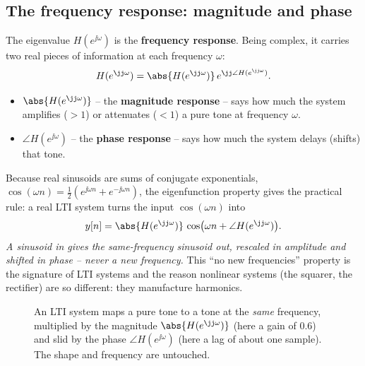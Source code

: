 \subsection*{The frequency response: magnitude and phase}

The eigenvalue $H(e^{\jj\omega})$ is the \textbf{frequency response}. Being
complex, it carries two real pieces of information at each frequency $\omega$:
\[
  H(e^{\jj\omega}) = \abs{H(e^{\jj\omega})}\,e^{\jj\angle H(e^{\jj\omega})}.
\]
\begin{itemize}
  \item $\abs{H(e^{\jj\omega})}$ -- the \textbf{magnitude response} -- says how
        much the system amplifies ($>1$) or attenuates ($<1$) a pure tone at
        frequency $\omega$.
  \item $\angle H(e^{\jj\omega})$ -- the \textbf{phase response} -- says how much
        the system delays (shifts) that tone.
\end{itemize}
Because real sinusoids are sums of conjugate exponentials,
$\cos(\omega n)=\tfrac12(e^{\jj\omega n}+e^{-\jj\omega n})$, the eigenfunction
property gives the practical rule: a real LTI system turns the input
$\cos(\omega n)$ into
\[
  y[n] = \abs{H(e^{\jj\omega})}\,\cos\!\big(\omega n + \angle H(e^{\jj\omega})\big).
\]
\emph{A sinusoid in gives the same-frequency sinusoid out, rescaled in amplitude
and shifted in phase -- never a new frequency.} This ``no new frequencies''
property is the signature of LTI systems and the reason nonlinear systems (the
squarer, the rectifier) are so different: they manufacture harmonics.

\begin{figure}[H]
\centering
{}
\caption{An LTI system maps a pure tone to a tone at the \emph{same} frequency,
multiplied by the magnitude $\abs{H(e^{\jj\omega})}$ (here a gain of $0.6$) and
slid by the phase $\angle H(e^{\jj\omega})$ (here a lag of about one sample).
The shape and frequency are untouched.}
\label{ch12:fig-eigen-sinusoid}
\end{figure}

